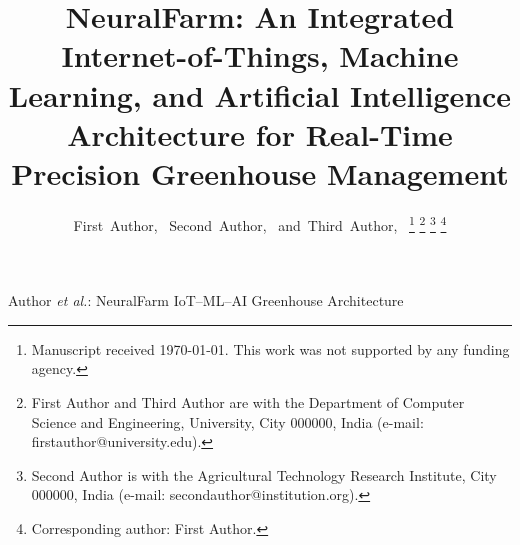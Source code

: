 \documentclass[journal,10pt,twocolumn]{IEEEtran}
\begin{document}
\title{NeuralFarm: An Integrated Internet-of-Things, Machine
  Learning, and Artificial Intelligence Architecture for
  Real-Time Precision Greenhouse Management}

\author{First~Author,~
        Second~Author,~
        and~Third~Author,~%
\thanks{Manuscript received \today.
  This work was not supported by any funding agency.}%
\thanks{First Author and Third Author are with the Department of
  Computer Science and Engineering, University, City 000000,
  India (e-mail: firstauthor@university.edu).}%
\thanks{Second Author is with the Agricultural Technology Research
  Institute, City 000000, India
  (e-mail: secondauthor@institution.org).}%
\thanks{Corresponding author: First Author.}}

%
{Author \MakeLowercase{\textit{et al.}}: NeuralFarm IoT--ML--AI
  Greenhouse Architecture}

\maketitle
\end{document}
